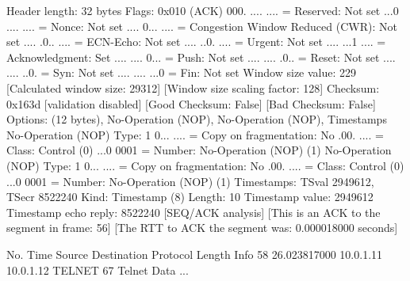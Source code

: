     Header length: 32 bytes
    Flags: 0x010 (ACK)
        000. .... .... = Reserved: Not set
        ...0 .... .... = Nonce: Not set
        .... 0... .... = Congestion Window Reduced (CWR): Not set
        .... .0.. .... = ECN-Echo: Not set
        .... ..0. .... = Urgent: Not set
        .... ...1 .... = Acknowledgment: Set
        .... .... 0... = Push: Not set
        .... .... .0.. = Reset: Not set
        .... .... ..0. = Syn: Not set
        .... .... ...0 = Fin: Not set
    Window size value: 229
    [Calculated window size: 29312]
    [Window size scaling factor: 128]
    Checksum: 0x163d [validation disabled]
        [Good Checksum: False]
        [Bad Checksum: False]
    Options: (12 bytes), No-Operation (NOP), No-Operation (NOP), Timestamps
        No-Operation (NOP)
            Type: 1
                0... .... = Copy on fragmentation: No
                .00. .... = Class: Control (0)
                ...0 0001 = Number: No-Operation (NOP) (1)
        No-Operation (NOP)
            Type: 1
                0... .... = Copy on fragmentation: No
                .00. .... = Class: Control (0)
                ...0 0001 = Number: No-Operation (NOP) (1)
        Timestamps: TSval 2949612, TSecr 8522240
            Kind: Timestamp (8)
            Length: 10
            Timestamp value: 2949612
            Timestamp echo reply: 8522240
    [SEQ/ACK analysis]
        [This is an ACK to the segment in frame: 56]
        [The RTT to ACK the segment was: 0.000018000 seconds]

No.     Time           Source                Destination           Protocol Length Info
     58 26.023817000   10.0.1.11             10.0.1.12             TELNET   67     Telnet Data ...

